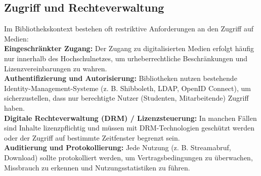 \documentclass[12pt,a4paper]{report}
\begin{document}
  \subsection{Zugriff und Rechteverwaltung}  
  Im Bibliothekskontext bestehen oft restriktive Anforderungen an den Zugriff auf Medien:
  \\
  \newline
  \textbf{Eingeschränkter Zugang:} Der Zugang zu digitalisierten Medien erfolgt häufig nur innerhalb des Hochschulnetzes, 
  um urheberrechtliche Beschränkungen und Lizenzvereinbarungen zu wahren.  
  \\
  \newline
  \textbf{Authentifizierung und Autorisierung:} Bibliotheken nutzen bestehende Identity-Management-Systeme (z. B. Shibboleth, LDAP, OpenID Connect), 
  um sicherzustellen, dass nur berechtigte Nutzer (Studenten, Mitarbeitende) Zugriff haben.  
  \\
  \newline
  \textbf{Digitale Rechteverwaltung (\ac{DRM}) / Lizenzsteuerung:} In manchen Fällen sind Inhalte lizenzpflichtig und müssen mit \ac{DRM}-Technologien geschützt werden 
  oder der Zugriff auf bestimmte Zeitfenster begrenzt sein.  
  \\
  \newline
  \textbf{Auditierung und Protokollierung:} Jede Nutzung (z. B. Streamabruf, Download) sollte protokolliert werden, 
  um Vertragsbedingungen zu überwachen, Missbrauch zu erkennen und Nutzungsstatistiken zu führen.  
\end{document}
